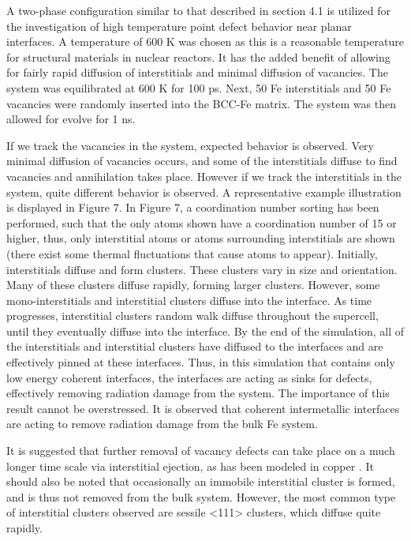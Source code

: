 \documentclass[review]{elsarticle}
\begin{document}
A two-phase configuration similar to that described in section 4.1 is utilized for the investigation of high temperature point defect behavior near planar interfaces.  A temperature of 600 K was chosen as this is a reasonable temperature for structural materials in nuclear reactors.  It has the added benefit of allowing for fairly rapid diffusion of interstitials and minimal diffusion of vacancies.  The system was equilibrated at 600 K for 100 ps.  Next, 50 Fe interstitials and 50 Fe vacancies were randomly inserted into the BCC-Fe matrix.  The system was then allowed for evolve for 1 ns.  

If we track the vacancies in the system, expected behavior is observed.  Very minimal diffusion of vacancies occurs, and some of the interstitials diffuse to find vacancies and annihilation takes place.  However if we track the interstitials in the system, quite different behavior is observed.  A representative example illustration is displayed in Figure 7.  In Figure 7, a coordination number sorting has been performed, such that the only atoms shown have a coordination number of 15 or higher, thus, only interstitial atoms or atoms surrounding interstitials are shown (there exist some thermal fluctuations that cause atoms to appear).  Initially, interstitials diffuse and form clusters.  These clusters vary in size and orientation.  Many of these clusters diffuse rapidly, forming larger clusters.  However, some mono-interstitials and interstitial clusters diffuse into the interface.  As time progresses, interstitial clusters random walk diffuse throughout the supercell, until they eventually diffuse into the interface.  By the end of the simulation, all of the interstitials and interstitial clusters have diffused to the interfaces and are effectively pinned at these interfaces.  Thus, in this simulation that contains only low energy coherent interfaces, the interfaces are acting as sinks for defects, effectively removing radiation damage from the system.  The importance of this result cannot be overstressed.  It is observed that coherent intermetallic interfaces are acting to remove radiation damage from the bulk Fe system.

It is suggested that further removal of vacancy defects can take place on a much longer time scale via interstitial ejection, as has been modeled in copper \cite{bai2010}.  It should also be noted that occasionally an immobile interstitial cluster is formed, and is thus not removed from the bulk system.  However, the most common type of interstitial clusters observed are sessile <111> clusters, which diffuse quite rapidly.  
\end{document}
